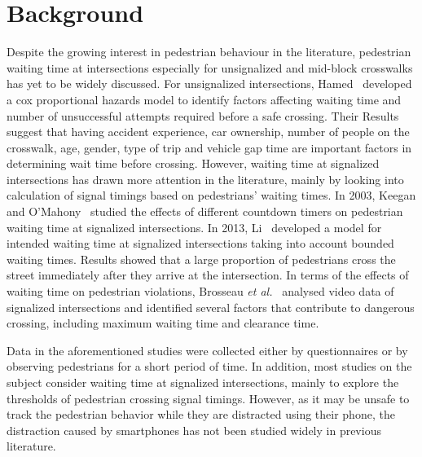 \section{Background}
\label{S:Dback}
Despite the growing interest in pedestrian behaviour in the literature, pedestrian waiting time at intersections especially for unsignalized and mid-block crosswalks has yet to be widely discussed. For unsignalized intersections, Hamed~\cite{hamed2001analysis} developed a cox proportional hazards model to identify factors affecting waiting time and number of unsuccessful attempts required before a safe crossing. Their Results suggest that having accident experience, car ownership, number of people on the crosswalk, age, gender, type of trip and vehicle gap time are important factors in determining wait time before crossing. However, waiting time at signalized intersections has drawn more attention in the literature, mainly by looking into calculation of signal timings based on pedestrians’ waiting times. In 2003, Keegan and O’Mahony~\cite{keegan2003modifying} studied the effects of different countdown timers on pedestrian waiting time at signalized intersections. In 2013, Li~\cite{li2013model} developed a model for intended waiting time at signalized intersections taking into account bounded waiting times. Results showed that a large proportion of pedestrians cross the street immediately after they arrive at the intersection. In terms of the effects of waiting time on pedestrian violations, Brosseau \textit{et al.}~\cite{brosseau2013impact} analysed video data of signalized intersections and identified several factors that contribute to dangerous crossing, including maximum waiting time and clearance time.  

 Data in the aforementioned studies were collected either by questionnaires or by observing pedestrians for a short period of time. In addition, most studies on the subject consider waiting time at signalized intersections, mainly to explore the thresholds of pedestrian crossing signal timings. However, as it may be unsafe to track the pedestrian behavior while they are distracted using their phone, the distraction caused by smartphones has not been studied widely in previous literature. 
 
